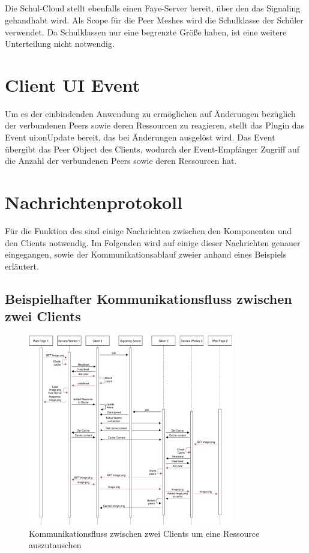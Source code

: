 \subsection{\schulCloud}

Die Schul-Cloud stellt ebenfalls einen Faye-Server bereit, über den das Signaling gehandhabt wird. Als Scope für die Peer Meshes wird die Schulklasse der Schüler verwendet. Da Schulklassen nur eine begrenzte Größe haben, ist eine weitere Unterteilung nicht notwendig.


\section{Client UI Event}
Um es der einbindenden Anwendung zu ermöglichen auf Änderungen bezüglich der verbundenen Peers sowie deren Ressourcen zu reagieren, stellt das Plugin das Event ui:onUpdate bereit, das bei Änderungen ausgelöst wird. Das Event übergibt das Peer Object des Clients, wodurch der Event-Empfänger Zugriff auf die Anzahl der verbundenen Peers sowie deren Ressourcen hat. 

\section{Nachrichtenprotokoll}\label{i:Nachrichten}

Für die Funktion des \cdns sind einige Nachrichten zwischen den Komponenten und den Clients notwendig. Im Folgenden wird auf einige dieser Nachrichten genauer eingegangen, sowie der Kommunikationsablauf zweier \clients anhand eines Beispiels erläutert.

\subsection{Beispielhafter Kommunikationsfluss zwischen zwei Clients}
\begin{figure}[!h]
	\centering
	\includegraphics[width=0.8\textwidth]{figures/message_flow_cdn}
	\caption[Kommunikationsfluss zwischen zwei Clients]{Kommunikationsfluss zwischen zwei Clients um eine Ressource auszutauschen}
	\label{fig:message_flow_cdn}
\end{figure}

